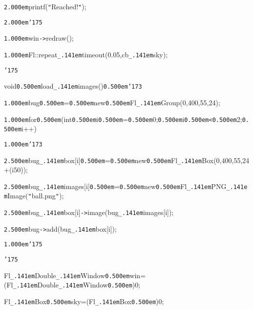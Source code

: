 \documentclass[12pt]{article}
\begin{document}
\noindent
{}{\tt\mc \kern2.000em}printf({\tt "}Reached!{\tt "});

\noindent
{}{\tt\mc \kern2.000em}{\tt\char'175}

\noindent
{}{\tt\mc \kern1.000em}win{\tt -}{\tt >}redraw();

\noindent
{}{\tt\mc \kern1.000em}Fl::repeat{\tt\_\kern.141em}timeout(0.05,cb{\tt\_\kern.141em}sky);

\noindent
{}{\tt\char'175}

\noindent
{}\hfill

\noindent
{}void{\tt\mc \kern0.500em}load{\tt\_\kern.141em}images(){\tt\mc \kern0.500em}{\tt\char'173}

\noindent
{}{\tt\mc \kern1.000em}bug{\tt\mc \kern0.500em}={\tt\mc \kern0.500em}new{\tt\mc \kern0.500em}Fl{\tt\_\kern.141em}Group(0,400,55,24);

\noindent
{}{\tt\mc \kern1.000em}for{\tt\mc \kern0.500em}(int{\tt\mc \kern0.500em}i{\tt\mc \kern0.500em}={\tt\mc \kern0.500em}0;{\tt\mc \kern0.500em}i{\tt\mc \kern0.500em}{\tt <}{\tt\mc \kern0.500em}2;{\tt\mc \kern0.500em}i++)

\noindent
{}{\tt\mc \kern1.000em}{\tt\char'173}

\noindent
{}{\tt\mc \kern2.500em}bug{\tt\_\kern.141em}box[i]{\tt\mc \kern0.500em}={\tt\mc \kern0.500em}new{\tt\mc \kern0.500em}Fl{\tt\_\kern.141em}Box(0,400,55,24+(i{\tt *}50));

\noindent
{}{\tt\mc \kern2.500em}bug{\tt\_\kern.141em}images[i]{\tt\mc \kern0.500em}={\tt\mc \kern0.500em}new{\tt\mc \kern0.500em}Fl{\tt\_\kern.141em}PNG{\tt\_\kern.141em}Image({\tt "}ball.png{\tt "});

\noindent
{}{\tt\mc \kern2.500em}bug{\tt\_\kern.141em}box[i]{\tt -}{\tt >}image(bug{\tt\_\kern.141em}images[i]);

\noindent
{}{\tt\mc \kern2.500em}bug{\tt -}{\tt >}add(bug{\tt\_\kern.141em}box[i]);

\noindent
{}{\tt\mc \kern1.000em}{\tt\char'175}

\noindent
{}{\tt\char'175}

\noindent
{}\hfill

\noindent
{}Fl{\tt\_\kern.141em}Double{\tt\_\kern.141em}Window{\tt\mc \kern0.500em}{\tt *}win=(Fl{\tt\_\kern.141em}Double{\tt\_\kern.141em}Window{\tt\mc \kern0.500em}{\tt *})0;

\noindent
{}\hfill

\noindent
{}Fl{\tt\_\kern.141em}Box{\tt\mc \kern0.500em}{\tt *}sky=(Fl{\tt\_\kern.141em}Box{\tt\mc \kern0.500em}{\tt *})0;
\end{document}

